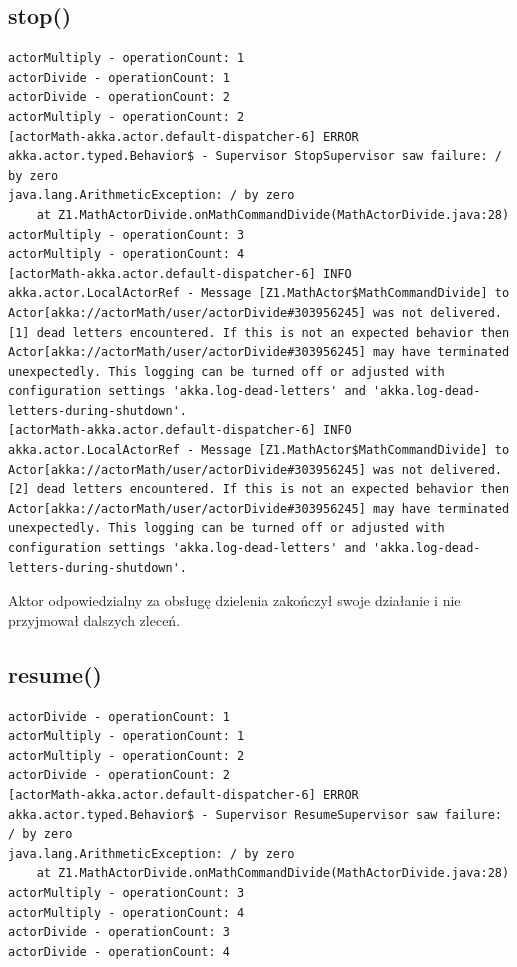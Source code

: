 \documentclass[12pt]{article}
\begin{document}
\subsection{stop()}
\begin{verbatim}
actorMultiply - operationCount: 1
actorDivide - operationCount: 1
actorDivide - operationCount: 2
actorMultiply - operationCount: 2
[actorMath-akka.actor.default-dispatcher-6] ERROR akka.actor.typed.Behavior$ - Supervisor StopSupervisor saw failure: / by zero
java.lang.ArithmeticException: / by zero
	at Z1.MathActorDivide.onMathCommandDivide(MathActorDivide.java:28)
actorMultiply - operationCount: 3
actorMultiply - operationCount: 4
[actorMath-akka.actor.default-dispatcher-6] INFO akka.actor.LocalActorRef - Message [Z1.MathActor$MathCommandDivide] to Actor[akka://actorMath/user/actorDivide#303956245] was not delivered. [1] dead letters encountered. If this is not an expected behavior then Actor[akka://actorMath/user/actorDivide#303956245] may have terminated unexpectedly. This logging can be turned off or adjusted with configuration settings 'akka.log-dead-letters' and 'akka.log-dead-letters-during-shutdown'.
[actorMath-akka.actor.default-dispatcher-6] INFO akka.actor.LocalActorRef - Message [Z1.MathActor$MathCommandDivide] to Actor[akka://actorMath/user/actorDivide#303956245] was not delivered. [2] dead letters encountered. If this is not an expected behavior then Actor[akka://actorMath/user/actorDivide#303956245] may have terminated unexpectedly. This logging can be turned off or adjusted with configuration settings 'akka.log-dead-letters' and 'akka.log-dead-letters-during-shutdown'.
\end{verbatim}

Aktor odpowiedzialny za obsługę dzielenia zakończył swoje działanie i nie przyjmował dalszych zleceń.

\subsection{resume()}
\begin{verbatim}
actorDivide - operationCount: 1
actorMultiply - operationCount: 1
actorMultiply - operationCount: 2
actorDivide - operationCount: 2
[actorMath-akka.actor.default-dispatcher-6] ERROR akka.actor.typed.Behavior$ - Supervisor ResumeSupervisor saw failure: / by zero
java.lang.ArithmeticException: / by zero
	at Z1.MathActorDivide.onMathCommandDivide(MathActorDivide.java:28)
actorMultiply - operationCount: 3
actorMultiply - operationCount: 4
actorDivide - operationCount: 3
actorDivide - operationCount: 4
\end{verbatim}
\end{document}
